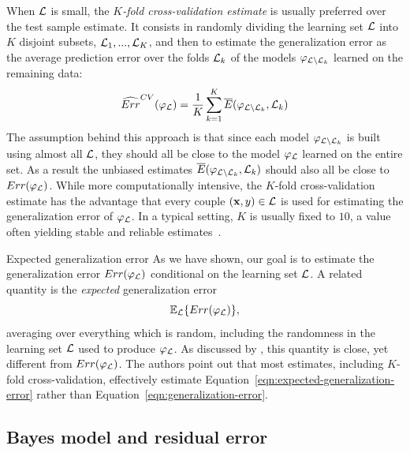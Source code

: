 When ${\cal L}$ is small, the \textit{$K$-fold cross-validation estimate}\label{ntn:K-cv} is
usually preferred over the test sample estimate. It consists in randomly
dividing the learning set ${\cal L}$ into $K$ disjoint subsets, ${\cal
L}_1, ..., {\cal L}_K$\label{ntn:L_k}, and then to estimate the generalization error as the average prediction error over the folds ${\cal
L}_k$ of the models $\varphi_{{\cal L}\setminus {\cal L}_k}$  learned on the
remaining data:
\begin{equation}\label{eqn:cv-error}
\widehat{Err}^{CV}(\varphi_{\cal L}) = \frac{1}{K} \sum_{k=1}^K  \overline{E}(\varphi_{{\cal L}\setminus{\cal L}_k}, {\cal L}_k)
\end{equation}
The assumption behind this approach is that since each model $\varphi_{{\cal L}\setminus{\cal L}_k}$ is
built using almost all ${\cal L}$, they should all be close to the model
$\varphi_{\cal L}$ learned on the entire set. As a result the unbiased
estimates $\overline{E}(\varphi_{{\cal L}\setminus{\cal L}_k}, {\cal L}_k)$ should also all be close to
$Err(\varphi_{\cal L})$. While more computationally intensive, the $K$-fold
cross-validation estimate has the advantage that every couple $(\mathbf{x}, y)
\in {\cal L}$ is used for estimating the generalization error of $\varphi_{\cal L}$. In
a typical setting, $K$ is usually fixed to $10$, a value often yielding stable
and reliable estimates~\citep{kohavi:1995}.

\begin{remark}{Expected generalization error}
As we have shown, our goal is to estimate the generalization error
$Err(\varphi_{\cal L})$ conditional on the learning set ${\cal L}$. A related
quantity is the \textit{expected} generalization error
\begin{equation}\label{eqn:expected-generalization-error}
\mathbb{E}_{\cal L} \{ Err(\varphi_{\cal L}) \},
\end{equation}
averaging over everything which is random, including the randomness in the
learning set ${\cal L}$ used to produce $\varphi_{\cal L}$. As discussed by
\citet{hastie:2005}, this quantity is close, yet different from
$Err(\varphi_{\cal L})$. The authors point out that most estimates, including $K$-fold
cross-validation, effectively estimate
Equation~\ref{eqn:expected-generalization-error} rather than
Equation~\ref{eqn:generalization-error}.
\end{remark}

\subsection{Bayes model and residual error}
\label{sec:2:bayes-model}

